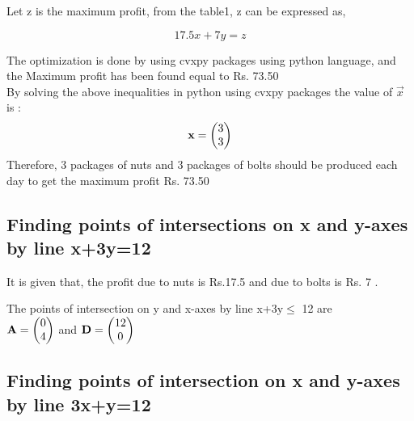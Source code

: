 \documentclass[journal,10pt,twocolumn]{article}
\begin{document}
\begin{flushleft}
Let z is the maximum profit, from the table1, z can be expressed as,
\end{flushleft}
\begin{equation}
17.5x+7y=z
\end{equation}

\begin{flushleft}
The optimization is done by using cvxpy packages using python language, and the Maximum profit has been found equal to Rs. 73.50\\
\vspace{0.25cm}
By solving the above inequalities in python using cvxpy packages the value of $\vec{x}$ is :
\begin{equation}
    \mathbf{x} = \begin{pmatrix}3\\3\end{pmatrix}
\end{equation}
Therefore, 3 packages of nuts and 3 packages of bolts should be produced each day to get the maximum profit Rs. 73.50
\end{flushleft}


\begin{flushleft}
\subsection{Finding points of intersections on x and y-axes by line x+3y=12}
It is given that, the profit due to nuts is Rs.17.5 and due to bolts is Rs. 7 .
\end{flushleft}
The points of intersection on y and x-axes by line x+3y$\le$ 12 are\\
\center
$\mathbf{A} =\begin{pmatrix}0\\4\end{pmatrix}$  and $\mathbf{D} =\begin{pmatrix}12\\0\end{pmatrix}$ \\
\endcenter
\begin{flushleft}
\subsection{Finding points of intersection on x and y-axes by line 3x+y=12}
\end{flushleft}
\end{document}
